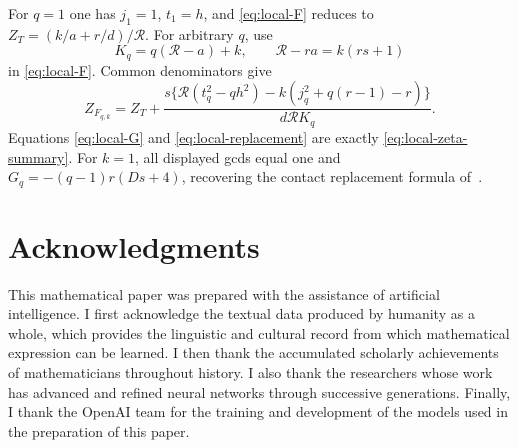 \documentclass[11pt]{article}
\numberwithin{equation}{section}
\theoremstyle{definition}
\theoremstyle{remark}
\begin{document}
For $q=1$ one has $j_1=1$, $t_1=h$, and
\eqref{eq:local-F} reduces to
$Z_T=(k/a+r/d)/\mathcal R$. For arbitrary $q$, use
\[
 K_q=q(\mathcal R-a)+k,\qquad
 \mathcal R-ra=k(rs+1)
\]
in \eqref{eq:local-F}. Common denominators give
\begin{equation}\label{eq:local-replacement}
 Z_{F_{q,k}}=Z_T+
 \frac{s\{\mathcal R(t_q^2-qh^2)
            -k(j_q^2+q(r-1)-r)\}}{d\mathcal R K_q}.
\end{equation}
Equations \eqref{eq:local-G} and \eqref{eq:local-replacement}
are exactly \eqref{eq:local-zeta-summary}. For $k=1$,
all displayed gcds equal one and
$G_q=-(q-1)r(Ds+4)$, recovering the contact replacement
formula of~\cite{Jiang26}.

\section*{Acknowledgments}

This mathematical paper was prepared with the assistance of artificial intelligence.  I
first acknowledge the textual data produced by humanity as a whole, which
provides the linguistic and cultural record from which mathematical expression
can be learned.  I then thank the accumulated scholarly achievements of
mathematicians throughout history.  I also thank the researchers whose work has
advanced and refined neural networks through successive generations.  Finally,
I thank the OpenAI team for the training and development of the models used in
the preparation of this paper.
\end{document}

